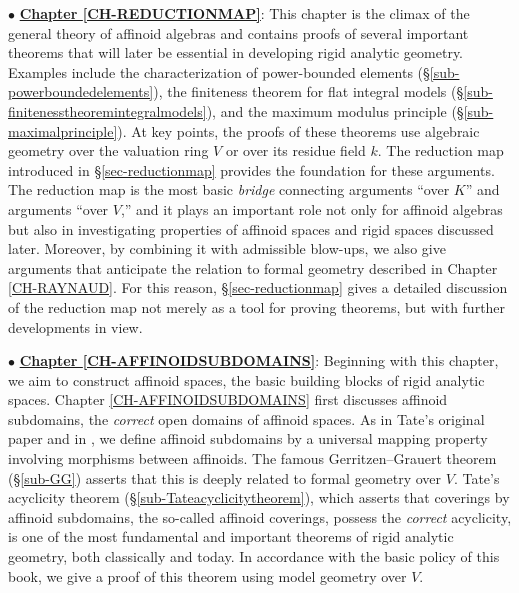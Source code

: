 \documentclass[a4paper,12pt, dvipdfmx]{jsbook}
\theoremstyle{plain}
\theoremstyle{definition}
\begin{document}
\medskip
$\bullet$ \underline{{\bf Chapter \ref{CH-REDUCTIONMAP}}}: This chapter is the climax of the general theory of affinoid algebras and contains proofs of several important theorems that will later be essential in developing rigid analytic geometry.
Examples include the characterization of power-bounded elements (\S\ref{sub-powerboundedelements}), the finiteness theorem for flat integral models (\S\ref{sub-finitenesstheoremintegralmodels}), and the maximum modulus principle (\S\ref{sub-maximalprinciple}).
At key points, the proofs of these theorems use algebraic geometry over the valuation ring $V$ or over its residue field $k$.
The reduction map introduced in \S\ref{sec-reductionmap} provides the foundation for these arguments.
The reduction map is the most basic {\it bridge} connecting arguments ``over $K$'' and arguments ``over $V$,'' and it plays an important role not only for affinoid algebras but also in investigating properties of affinoid spaces and rigid spaces discussed later.
Moreover, by combining it with admissible blow-ups, we also give arguments that anticipate the relation to formal geometry described in Chapter \ref{CH-RAYNAUD}.
For this reason, \S\ref{sec-reductionmap} gives a detailed discussion of the reduction map not merely as a tool for proving theorems, but with further developments in view.

\medskip
$\bullet$ \underline{{\bf Chapter \ref{CH-AFFINOIDSUBDOMAINS}}}: Beginning with this chapter, we aim to construct affinoid spaces, the basic building blocks of rigid analytic spaces.
Chapter \ref{CH-AFFINOIDSUBDOMAINS} first discusses affinoid subdomains, the {\it correct} open domains of affinoid spaces.
As in Tate's original paper \cite{Tate1} and in \cite{BGR}, we define affinoid subdomains by a universal mapping property involving morphisms between affinoids.
The famous Gerritzen--Grauert theorem (\S\ref{sub-GG}) asserts that this is deeply related to formal geometry over $V$.
Tate's acyclicity theorem (\S\ref{sub-Tateacyclicitytheorem}), which asserts that coverings by affinoid subdomains, the so-called affinoid coverings, possess the {\it correct} acyclicity, is one of the most fundamental and important theorems of rigid analytic geometry, both classically and today.
In accordance with the basic policy of this book, we give a proof of this theorem using model geometry over $V$.
\end{document}
